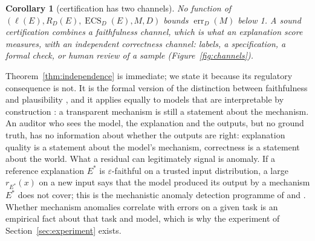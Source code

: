 \documentclass[11pt,letterpaper]{article}
\newcommand{\D}{D}
\DeclareMathOperator{\ECS}{ECS}
\DeclareMathOperator{\err}{err}
\theoremstyle{plain}
\newtheorem{corollary}{Corollary}
\theoremstyle{definition}
\theoremstyle{remark}
\begin{document}
\begin{corollary}[certification has two channels]
\label{cor:twochannel}
No function of $(\ell(E),R_{\D}(E),\ECS_{\D}(E),M,\D)$ bounds $\err_{\D}(M)$ below 1. A sound certification combines a \emph{faithfulness channel}, which is what an explanation score measures, with an independent \emph{correctness channel}: labels, a specification, a formal check, or human review of a sample (Figure~\ref{fig:channels}).
\end{corollary}

Theorem~\ref{thm:independence} is immediate; we state it because its regulatory consequence is not. It is the formal version of the distinction between faithfulness and plausibility \citep{jacovi2020,lipton2018}, and it applies equally to models that are interpretable by construction \citep{rudin2019}: a transparent mechanism is still a statement about the mechanism. An auditor who sees the model, the explanation and the outputs, but no ground truth, has no information about whether the outputs are right: explanation quality is a statement about the model's mechanism, correctness is a statement about the world. What a residual can legitimately signal is anomaly. If a reference explanation $E^{*}$ is $\varepsilon$-faithful on a trusted input distribution, a large $r_{E^{*}}(x)$ on a new input says that the model produced its output by a mechanism $E^{*}$ does not cover; this is the mechanistic anomaly detection programme of \citet{christiano2022mad} and \citet{jenner2024mad}. Whether mechanism anomalies correlate with errors on a given task is an empirical fact about that task and model, which is why the experiment of Section~\ref{sec:experiment} exists.
\end{document}
